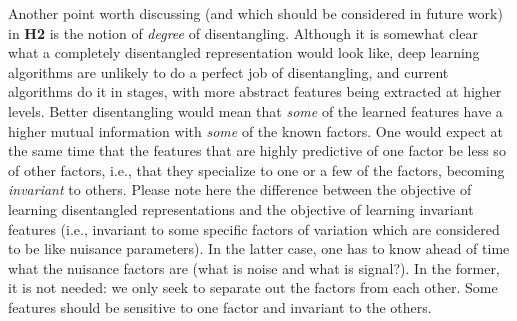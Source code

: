 Another point worth discussing (and which should be considered in future
work) in {\bf H2} is the notion of {\em degree} of disentangling.  Although
it is somewhat clear what a completely disentangled representation would
look like, deep learning algorithms are unlikely to do a perfect job of
disentangling, and current algorithms do it in stages, with more abstract
features being extracted at higher levels. 
Better disentangling would mean that {\em some} of the learned features
have a higher mutual information with {\em some} of the known factors. One would
expect at the same time that the features that are highly predictive of one
factor be less so of other factors, i.e., that they specialize to one or a
few of the factors, becoming {\em invariant} to others. Please note here
the difference between the objective of learning disentangled
representations and the objective of learning invariant features (i.e.,
invariant to some specific factors of variation which are considered to be
like nuisance parameters). In the latter case, one has to know ahead of
time what the nuisance factors are (what is noise and what is signal?).
In the former, it is not needed: we only seek to separate out the factors
from each other. Some features should be sensitive to one factor and
invariant to the others. 

